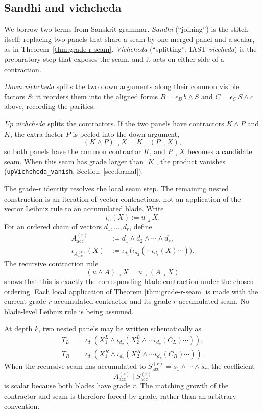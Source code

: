 \documentclass[11pt]{article}
\begin{document}
\subsection{Sandhi and vichcheda}

We borrow two terms from Sanskrit grammar. \textit{Sandhi} (``joining'') is the
stitch itself: replacing two panels that share a seam by one merged panel and
a scalar, as in Theorem~\ref{thm:grade-r-seam}. \textit{Vichcheda} (``splitting''; IAST \textit{viccheda}) is
the preparatory step that exposes the seam, and it acts on either side of a
contraction.

\emph{Down vichcheda} splits the two down arguments along their common visible
factors \(S\): it reorders them into the aligned forms \(B=\epsilon_B\,b\wedge
S\) and \(C=\epsilon_C\,S\wedge c\) above, recording the parities.

\emph{Up vichcheda} splits the contractors. If the two panels have contractors
\(K\wedge P\) and \(K\), the extra factor \(P\) is peeled into the down
argument,
\[
(K\wedge P)\mathbin{\lrcorner}X = K\mathbin{\lrcorner}(P\mathbin{\lrcorner}X),
\]
so both panels have the common contractor \(K\), and \(P\mathbin{\lrcorner}X\)
becomes a candidate seam. When this seam has grade larger than
\(\lvert K\rvert\), the product vanishes (\texttt{upVichcheda\_vanish},
Section~\ref{sec:formal}).

The grade-\(r\) identity resolves the local seam step. The remaining nested
construction is an iteration of vector contractions, not an application of
the vector Leibniz rule to an accumulated blade. Write
\[
  \iota_u(X):=u\mathbin{\lrcorner}X .
\]
For an ordered chain of vectors \(d_1,\ldots,d_r\), define
\[
\begin{aligned}
A_{\mathrm{acc}}^{(r)}
  &:=d_1\wedge d_2\wedge\cdots\wedge d_r,\\
\iota_{A_{\mathrm{acc}}^{(r)}}(X)
  &:=\iota_{d_1}\bigl(
      \iota_{d_2}(\cdots\iota_{d_r}(X)\cdots)
    \bigr).
\end{aligned}
\]
The recursive contraction rule
\[
  (u\wedge A)\mathbin{\lrcorner}X
  =
  u\mathbin{\lrcorner}(A\mathbin{\lrcorner}X)
\]
shows that this is exactly the corresponding blade contraction under the
chosen ordering. Each local application of Theorem
\ref{thm:grade-r-seam} is made with the current grade-\(r\) accumulated
contractor and its grade-\(r\) accumulated seam. No blade-level Leibniz rule
is being assumed.

At depth \(k\), two nested panels may be written schematically as
\[
\begin{aligned}
T_L&=\iota_{d_1}\left(
 X^L_1\wedge\iota_{d_2}\left(
 X^L_2\wedge\cdots\iota_{d_k}(C_L)\cdots\right)\right),\\
T_R&=\iota_{d_1}\left(
 X^R_1\wedge\iota_{d_2}\left(
 X^R_2\wedge\cdots\iota_{d_k}(C_R)\cdots\right)\right).
\end{aligned}
\]
When the recursive seam has accumulated to
\(S_{\mathrm{acc}}^{(r)}=s_1\wedge\cdots\wedge s_r\), the coefficient
\[
  A_{\mathrm{acc}}^{(r)}\mid S_{\mathrm{acc}}^{(r)}
\]
is scalar because both blades have grade \(r\). The matching growth of the
contractor and seam is therefore forced by grade, rather than an arbitrary
convention.
\end{document}
